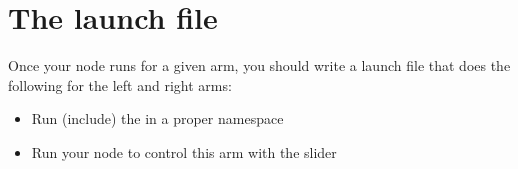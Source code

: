 \documentclass{ecnreport}
\begin{document}
\section{The launch file}

Once your node runs for a given arm, you should write a launch file that does the following for the left and right arms:
\begin{itemize}
 \item Run (include) the  in a proper namespace
 \item Run your node to control this arm with the slider
\end{itemize}
\end{document}

